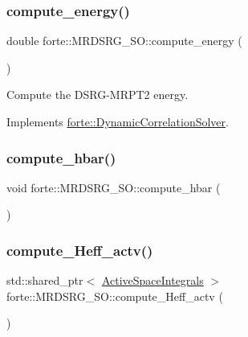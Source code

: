\subsubsection{\texorpdfstring{compute\+\_\+energy()}{compute\_energy()}}
{\footnotesize\ttfamily double forte\+::\+M\+R\+D\+S\+R\+G\+\_\+\+S\+O\+::compute\+\_\+energy (\begin{DoxyParamCaption}{ }\end{DoxyParamCaption})\hspace{0.3cm}{\ttfamily [virtual]}}



Compute the D\+S\+R\+G-\/\+M\+R\+P\+T2 energy. 



Implements \mbox{\hyperlink{classforte_1_1_dynamic_correlation_solver_aff4c7ebdca64563939d6e3ab8a262150}{forte\+::\+Dynamic\+Correlation\+Solver}}.

\mbox{\label{classforte_1_1_m_r_d_s_r_g___s_o_abddd0970f2fdd9e1f69ffb6cfe23b57b}} 
\subsubsection{\texorpdfstring{compute\+\_\+hbar()}{compute\_hbar()}}
{\footnotesize\ttfamily void forte\+::\+M\+R\+D\+S\+R\+G\+\_\+\+S\+O\+::compute\+\_\+hbar (\begin{DoxyParamCaption}{ }\end{DoxyParamCaption})\hspace{0.3cm}{\ttfamily [protected]}}

\mbox{\label{classforte_1_1_m_r_d_s_r_g___s_o_a2c927466355d27797fb2a7b5ff478779}} 
\subsubsection{\texorpdfstring{compute\+\_\+\+Heff\+\_\+actv()}{compute\_Heff\_actv()}}
{\footnotesize\ttfamily std\+::shared\+\_\+ptr$<$ \mbox{\hyperlink{classforte_1_1_active_space_integrals}{Active\+Space\+Integrals}} $>$ forte\+::\+M\+R\+D\+S\+R\+G\+\_\+\+S\+O\+::compute\+\_\+\+Heff\+\_\+actv (\begin{DoxyParamCaption}{ }\end{DoxyParamCaption})\hspace{0.3cm}{\ttfamily [virtual]}}



